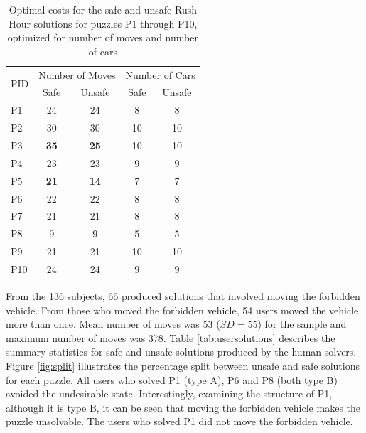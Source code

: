 \begin{table}[!htb]
\begin{tabular}{|l|c|c|c|c|}
\hline
\multirow{2}{*}{PID} & \multicolumn{2}{l|}{Number of Moves} & \multicolumn{2}{l|}{Number of Cars} \\ \cline{2-5} 
    & Safe & Unsafe & Safe & Unsafe \\ \hline
P1  & 24   & 24     & 8    & 8      \\ 
P2  & 30   & 30     & 10   & 10     \\ 
P3  & \textbf{35}   & \textbf{25}     & 10   & 10     \\ 
P4  & 23   & 23     & 9    & 9      \\ 
P5  & \textbf{21}   & \textbf{14}     & 7    & 7      \\ 
P6  & 22   & 22     & 8    & 8      \\ 
P7  & 21   & 21     & 8    & 8      \\ 
P8  & 9    & 9      & 5    & 5      \\ 
P9  & 21   & 21     & 10   & 10     \\
P10 & 24   & 24     & 9    & 9      \\ \hline
\end{tabular}
\caption{Optimal costs for the safe and unsafe Rush Hour solutions for puzzles P1 through P10, optimized for number of moves and number of cars}
\label{tab:optimals}
\end{table}

From the 136 subjects, 66 produced solutions that involved moving the forbidden vehicle. From those who moved the forbidden vehicle, 54 users moved the vehicle more than once. Mean number of moves was 53 ($SD=55$) for the sample and maximum number of moves was 378. Table \ref{tab:usersolutions} describes the summary statistics for safe and unsafe solutions produced by the human solvers. Figure \ref{fig:split} illustrates the percentage split between unsafe and safe solutions for each puzzle. All users who solved P1 (type A), P6 and P8 (both type B) avoided the undesirable state. Interestingly, examining the structure of P1, although it is type B, it can be seen that moving the forbidden vehicle makes the puzzle unsolvable. The users who solved P1 did not move the forbidden vehicle. 

